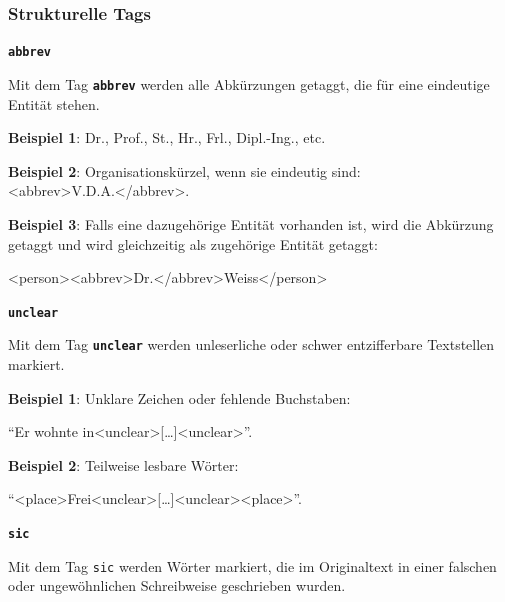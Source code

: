 \documentclass[12pt, a4paper, ngerman, bidi=default]{article}
\begin{document}
    \subsubsection{Strukturelle Tags}
    \begin{description}

    \item \textbf{\colorbox{abbrev}{\texttt{abbrev}}}
        
    Mit dem Tag \texttt{\texttt{\textbf{{\colorbox{abbrev}{abbrev}}}}} werden alle Abkürzungen getaggt, die für eine eindeutige Entität stehen.

    
    \noindent\textbf{ Beispiel 1}: Dr., Prof., St., Hr., Frl., Dipl.-Ing., etc.

    \textbf{ Beispiel 2}: Organisationskürzel, wenn sie eindeutig sind:\\\colorbox{VeryLightGray}{\textless abbrev\textgreater V.D.A.\textless /abbrev\textgreater}.

    \textbf{\textbf{ Beispiel 3}}: Falls eine dazugehörige Entität vorhanden ist, wird die Abkürzung getaggt und wird gleichzeitig als zugehörige Entität getaggt:

    \colorbox{VeryLightGray}{\textless person\textgreater \textless abbrev\textgreater Dr.\textless /abbrev\textgreater Weiss{\textless /person\textgreater}}
    
    \item \textbf{\colorbox{unclear}{\texttt{unclear}}}
    

    Mit dem Tag \texttt{\texttt{\textbf{{\colorbox{unclear}{unclear}}}}} werden unleserliche oder schwer entzifferbare Textstellen markiert.
    
    \noindent\textbf{ Beispiel 1}: Unklare Zeichen oder fehlende Buchstaben: 

    \colorbox{VeryLightGray}{\enquote{Er wohnte in\textless unclear\textgreater [\ldots]\textless unclear\textgreater}.}

    \textbf{ Beispiel 2}: Teilweise lesbare Wörter:

    \colorbox{VeryLightGray}{\enquote{{\textless place\textgreater Frei\textless unclear\textgreater [\ldots]\textless unclear\textgreater \textless place\textgreater}}.}

    
    \item\texttt{\textbf{{\colorbox{sic}{sic}}}} 

    Mit dem Tag \texttt{sic} werden Wörter markiert, die im Originaltext in einer falschen oder ungewöhnlichen Schreibweise geschrieben wurden.


\end{description}
\end{document}
